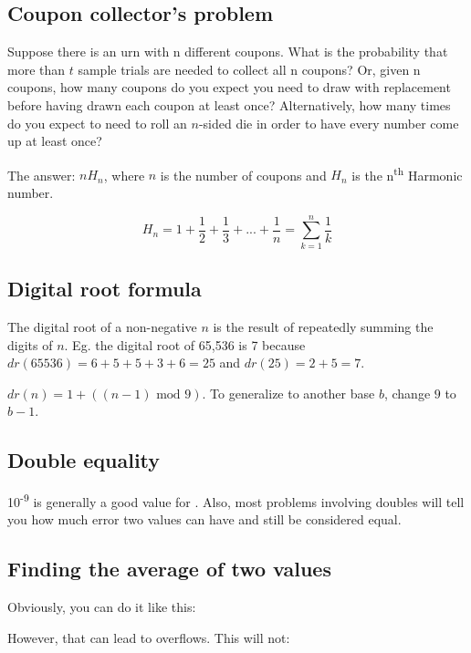 
\subsection*{Coupon collector's problem}

Suppose there is an urn with n different coupons. What is the probability that more than $t$ sample trials are needed to collect all n coupons? Or, given n coupons, how many coupons do you expect you need to draw with replacement before having drawn each coupon at least once? Alternatively, how many times do you expect to need to roll an $n$-sided die in order to have every number come up at least once?

The answer: $n H_n$, where $n$ is the number of coupons and $H_n$ is the n\textsuperscript{th} Harmonic number.

$$H_n = 1 + \frac{1}{2} + \frac{1}{3} + ... + \frac{1}{n} = \sum_{k=1}^n \frac{1}{k}$$

\subsection*{Digital root formula}

The digital root of a non-negative $n$ is the result of repeatedly summing the digits of $n$. Eg. the digital root of 65,536 is 7 because $dr(65536) = 6+5+5+3+6 = 25$ and $dr(25) = 2+5 = 7$. 

$dr(n) = 1 + ((n-1) \text{ mod } 9)$. To generalize to another base $b$, change $9$ to $b-1$.

\subsection*{Double equality}

10\textsuperscript{-9} is generally a good value for . Also, most problems involving doubles will tell you how much error two values can have and still be considered equal.



\subsection*{Finding the average of two values}

Obviously, you can do it like this: 

However, that can lead to overflows. This will not: 

